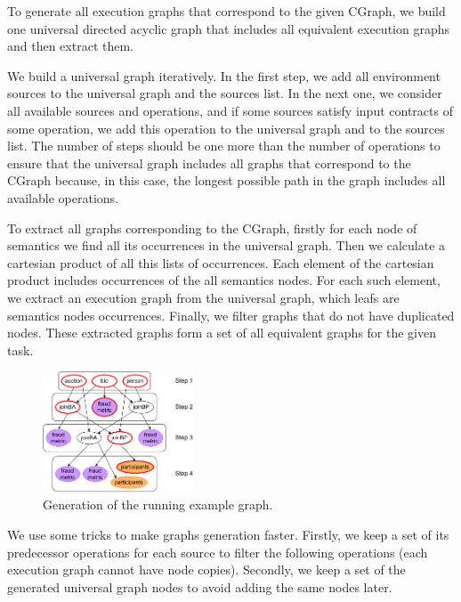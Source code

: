 To generate all execution graphs that correspond to the given CGraph, we build one universal directed acyclic graph that includes all equivalent execution graphs and then extract them.

We build a universal graph iteratively.
In the first step, we add all environment sources to the universal graph and the sources list.
In the next one, we consider all available sources and operations, and if some sources satisfy input contracts of some operation, we add this operation to the universal graph and to the sources list.
The number of steps should be one more than the number of operations to ensure that the universal graph includes all graphs that correspond to the CGraph because, in this case, the longest possible path in the graph includes all available operations.

To extract all graphs corresponding to the CGraph, firstly for each node of semantics we find all its occurrences in the universal graph.
Then we calculate a cartesian product of all this lists of occurrences.
Each element of the cartesian product includes occurrences of the all semantics nodes.
For each such element, we extract an execution graph from the universal graph, which leafs are semantics nodes occurrences.
Finally, we filter graphs that do not have duplicated nodes.
These extracted graphs form a set of all equivalent graphs for the given task.

\begin{figure}
    \flushright
    \includegraphics[width=0.4\textwidth]{images/generation}
    \caption{Generation of the running example graph.}
    \label{fig:gen}
\end{figure}

We use some tricks to make graphs generation faster.
Firstly, we keep a set of its predecessor operations for each source to filter the following operations (each execution graph cannot have node copies).
Secondly, we keep a set of the generated universal graph nodes to avoid adding the same nodes later.



